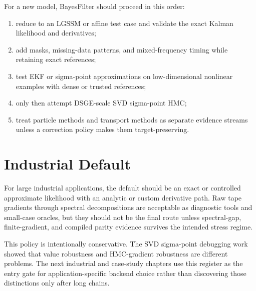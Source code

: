 For a new model, BayesFilter should proceed in this order:
\begin{enumerate}[label=(\roman*)]
  \item reduce to an LGSSM or affine test case and validate the exact Kalman
    likelihood and derivatives;
  \item add masks, missing-data patterns, and mixed-frequency timing while
    retaining exact references;
  \item test EKF or sigma-point approximations on low-dimensional nonlinear
    examples with dense or trusted references;
  \item only then attempt DSGE-scale SVD sigma-point HMC;
  \item treat particle methods and transport methods as separate evidence
    streams unless a correction policy makes them target-preserving.
\end{enumerate}

\section{Industrial Default}
\label{sec:bf-filter-choice-industrial-default}

For large industrial applications, the default should be an exact or controlled
approximate likelihood with an analytic or custom derivative path.  Raw tape
gradients through spectral decompositions are acceptable as diagnostic tools and
small-case oracles, but they should not be the final route unless spectral-gap,
finite-gradient, and compiled parity evidence survives the intended stress
regime.

This policy is intentionally conservative.  The SVD sigma-point debugging work
showed that value robustness and HMC-gradient robustness are different
problems.  The next industrial and case-study chapters use this register as the
entry gate for application-specific backend choice rather than discovering those
distinctions only after long chains.

